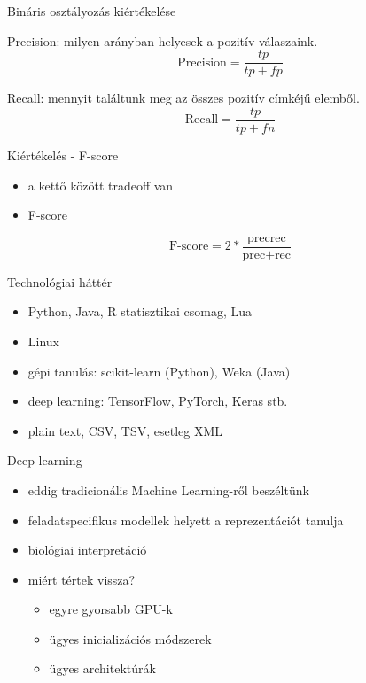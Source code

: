 \documentclass[bigger]{beamer}
\begin{document}
\begin{frame}{Bináris osztályozás kiértékelése}

Precision: milyen arányban helyesek a pozitív válaszaink.
\begin{equation*}
	\text{Precision}=\frac{tp}{tp+fp}
\end{equation*}

Recall: mennyit találtunk meg az összes pozitív címkéjű elemből.
\begin{equation*}
	\text{Recall}=\frac{tp}{tp+fn}
\end{equation*}

\end{frame}

\begin{frame}{Kiértékelés - F-score}
    \begin{itemize}
            \item a kettő között tradeoff van
                \item F-score
    \end{itemize}

    \begin{equation*}
        \text{F-score} = 2 * \frac{\text{prec}  \text{rec}}{\text{prec} + \text{rec}}
    \end{equation*}
\end{frame}
\begin{frame}{Technológiai háttér}
    \begin{itemize}
        \item Python, Java, R statisztikai csomag, Lua
        \item Linux
        \item gépi tanulás: scikit-learn (Python), Weka (Java)
        \item deep learning: TensorFlow, PyTorch, Keras stb.
        \item plain text, CSV, TSV, esetleg XML
    \end{itemize}
\end{frame}

\begin{frame}{Deep learning}
    \begin{itemize}
    	\item eddig tradicionális Machine Learning-ről beszéltünk
        \item feladatspecifikus modellek helyett a reprezentációt tanulja
        \item biológiai interpretáció
        \item miért tértek vissza?
            \begin{itemize}
                \item egyre gyorsabb GPU-k
                \item ügyes inicializációs módszerek
                \item ügyes architektúrák
            \end{itemize}
    \end{itemize}
\end{frame}
\end{document}
